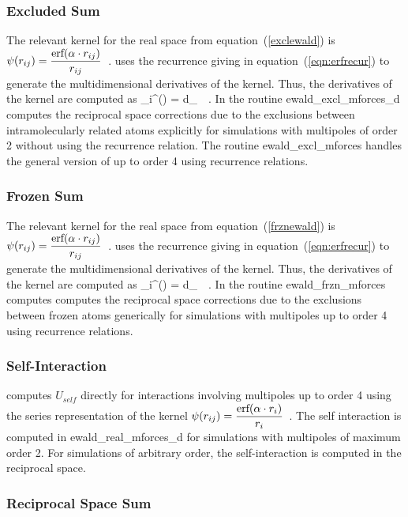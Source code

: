 \subsubsection*{Excluded Sum}

The relevant kernel for the real space from equation~(\ref{exclewald}) is
$\displaystyle \psi(r_{ij}) = \frac{\textrm{erf}(\alpha \cdot r_{ij})}{r_{ij}}$~.
\D uses the recurrence giving in equation~(\ref{eqn:erfrecur}) to generate
the multidimensional derivatives of the kernel.  Thus, the derivatives of
the kernel are computed as
\beq
\bd_i^{\bs}\psi(\rij) = d_{\bs}~~.
\eeq
\noindent
In \D the routine {\sc ewald\_excl\_mforces\_d} computes the reciprocal
space corrections due to the exclusions between intramolecularly related
atoms explicitly for simulations with multipoles of order 2 without
using the recurrence relation.  The routine {\sc ewald\_excl\_mforces}
handles the general version of up to order 4 using recurrence relations.

\subsubsection*{Frozen Sum}

The relevant kernel for the real space from equation~(\ref{frznewald}) is
$\displaystyle \psi(r_{ij}) = \frac{\textrm{erf}(\alpha \cdot r_{ij})}{r_{ij}}$~.
\D uses the recurrence giving in equation~(\ref{eqn:erfrecur}) to generate
the multidimensional derivatives of the kernel.  Thus, the derivatives of
the kernel are computed as
\beq
\bd_i^{\bs}\psi(\rij) = d_{\bs}~~.
\eeq
\noindent
In \D the routine {\sc ewald\_frzn\_mforces} computes computes the
reciprocal space corrections due to the exclusions between frozen
atoms generically for simulations with multipoles up to order 4
using recurrence relations.

\subsubsection*{Self-Interaction}

\D computes $U_{self}$ directly for interactions involving multipoles up
to order 4 using the series representation of the kernel
$\displaystyle \psi(r_{ij}) = \frac{\textrm{erf}(\alpha \cdot r_i)}{r_i}$~.
The self interaction is computed in {\sc ewald\_real\_mforces\_d} for
simulations with multipoles of maximum order 2.  For simulations of
arbitrary order, the self-interaction is computed in the reciprocal space.

\subsubsection*{Reciprocal Space Sum}

